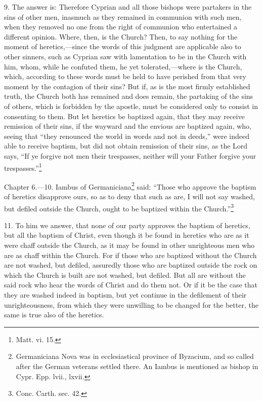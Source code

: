 9. The answer is: Therefore Cyprian and all those bishops were partakers in the sins of other men, inasmuch as they remained in communion with such men, when they removed no one from the right of communion who entertained a different opinion. Where, then, is the Church? Then, to say nothing for the moment of heretics,—since the words of this judgment are applicable also to other sinners, such as Cyprian saw with lamentation to be in the Church with him, whom, while he confuted them, he yet tolerated,—where is the Church, which, according to these words must be held to have perished from that very moment by the contagion of their sins? But if, as is the most firmly established truth, the Church both has remained and does remain, the partaking of the sins of others, which is forbidden by the apostle, must be considered only to consist in consenting to them. But let heretics be baptized again, that they may receive remission of their sins, if the wayward and the envious are baptized again, who, seeing that ``they renounced the world in words and not in deeds,'' were indeed able to receive baptism, but did not obtain remission of their sins, as the Lord says, ``If ye forgive not men their trespasses, neither will your Father forgive your trespasses.''\footnote{\par  Matt. vi. 15.}


Chapter 6.—10. Iambus of Germaniciana\footnote{\par  Germaniciana Nova was in ecclesiastical province of Byzacium, and so called after the German veterans settled there. An Iambus is mentioned as bishop in Cypr. Epp. lvii., lxvii.} said: ``Those who approve the baptism of heretics disapprove ours, so as to deny that such as are, I will not say washed, but defiled outside the Church, ought to be baptized within the Church.''\footnote{\par  Conc. Carth. sec. 42.}

11. To him we answer, that none of our party approves the baptism of heretics, but all the baptism of Christ, even though it be found in heretics who are as it were chaff outside the Church, as it may be found in other unrighteous men who are as chaff within the Church. For if those who are baptized without the Church are not washed, but defiled, assuredly those who are baptized outside the rock on which the Church is built are not washed, but defiled. But all are without the said rock who hear the words of Christ and do them not. Or if it be the case that they are washed indeed in baptism, but yet continue in the defilement of their unrighteousness, from which they were unwilling to be changed for the better, the same is true also of the heretics.

